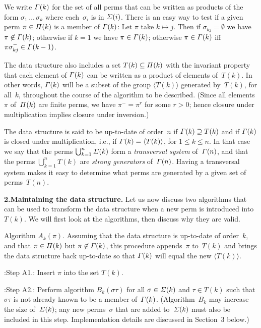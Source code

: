 We write ${\mit\Gamma}(k)$ for the set of all perms that can be written as products
of the form $\sigma_1\,\ldots\,\sigma_k$ where each~$\sigma_i$ is in
${\mit\Sigma}(i)$. There is an
easy way to test if a given perm $\pi\in{\mit\Pi}(k)$ is a member of ${\mit\Gamma}(k)$:
Let $\pi$ take $k\mapsto j$. Then if $\sigma_{kj}=\emptyset$
we have $\pi\not\in{\mit\Gamma}(k)$; otherwise if $k=1$ we have
$\pi\in{\mit\Gamma}(k)$; otherwise $\pi\in{\mit\Gamma}(k)$ iff
$\pi\sigma_{kj}^-\in{\mit\Gamma}(k-1)$.

The data structure also includes a set $T(k)\subseteq{\mit\Pi}(k)$
with the invariant property that each element of ${\mit\Gamma}(k)$ can be written
as a product of elements of~$T(k)$. 
In other words,
${\mit\Gamma}(k)$ will be a subset of the group $\langle T(k)\rangle$ generated
by~$T(k)$, for all~$k$, throughout the course of the algorithm to be described.
(Since all elements $\pi$ of~${\mit\Pi}(k)$ are finite perms, we have
$\pi^-=\pi^r$ for some $r>0$; hence closure under multiplication
implies closure under inversion.)

The data structure is said to be up-to-date of order~$n$ if 
${\mit\Gamma}(k)\supseteq T(k)$ and if ${\mit\Gamma}(k)$ is
closed under multiplication, i.e., if ${\mit\Gamma}(k)=\langle T(k)\rangle$,
for $1\le k\le n$. In that case we say that the perms $\bigcup_{k=1}^n{\mit\Sigma}(k)$
form a {\sl transversal system\/} of~${\mit\Gamma}(n)$, and that
the perms $\bigcup_{k=1}^n T(k)$ are {\sl strong generators\/} of~${\mit\Gamma}(n)$.
Having a transversal system
makes it easy to determine what perms are generated by a given set
of perms~$T(n)$.

\medskip\noindent
{\bf 2.\enspace Maintaining the data structure.}\enspace
Let us now discuss two algorithms that can be used to transform the data
structure when a new perm is introduced into~$T(k)$. We will first look at
the algorithms, then discuss why they are valid.

\vfill\eject

\noindent
{\sc Algorithm} $A_k(\pi)$.\enspace
Assuming that the data structure is up-to-date of order~$k$, and that
$\pi\in{\mit\Pi}(k)$ but $\pi\not\in{\mit\Gamma}(k)$, this procedure appends~$\pi$
to~$T(k)$ and brings the data structure back up-to-date so that ${\mit\Gamma}(k)$
will equal the new $\langle T(k)\rangle$.

\display 50pt:Step A1.:
Insert $\pi$ into the set $T(k)$.

\display 50pt:Step A2.:
Perform algorithm $B_k(\sigma\tau)$ for all $\sigma\in{\mit\Sigma}(k)$ and 
$\tau\in T(k)$ such that $\sigma\tau$ is not already known to be a member
of~${\mit\Gamma}(k)$. 
(Algorithm~$B_k$ may increase the size of~${\mit\Sigma}(k)$; any
new perms~$\sigma$ that are added to~${\mit\Sigma}(k)$ must also be included
in this step. Implementation details are discussed in Section~3 
below.)\quad\blackslug

